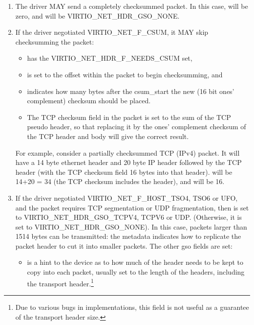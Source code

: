 \begin{enumerate}
\item The driver MAY send a completely checksummed packet.  In this case,
   will be zero, and  will be VIRTIO_NET_HDR_GSO_NONE.

\item If the driver negotiated VIRTIO_NET_F_CSUM, it MAY skip
  checksumming the packet:
  \begin{itemize}
  \item {} has the VIRTIO_NET_HDR_F_NEEDS_CSUM set,

  \item {} is set to the offset within the packet to begin checksumming,
    and

  \item {} indicates how many bytes after the csum_start the
    new (16 bit ones' complement) checksum should be placed.

  \item The TCP checksum field in the packet is set to the sum
    of the TCP pseudo header, so that replacing it by the ones'
    complement checksum of the TCP header and body will give the
    correct result.
  \end{itemize}

\begin{note}
For example, consider a partially checksummed TCP (IPv4) packet.
It will have a 14 byte ethernet header and 20 byte IP header
followed by the TCP header (with the TCP checksum field 16 bytes
into that header).  will be 14+20 = 34 (the TCP
checksum includes the header), and  will be 16.
\end{note}

\item If the driver negotiated
  VIRTIO_NET_F_HOST_TSO4, TSO6 or UFO, and the packet requires
  TCP segmentation or UDP fragmentation, then 
  is set to VIRTIO_NET_HDR_GSO_TCPV4, TCPV6 or UDP.
  (Otherwise, it is set to VIRTIO_NET_HDR_GSO_NONE). In this
  case, packets larger than 1514 bytes can be transmitted: the
  metadata indicates how to replicate the packet header to cut it
  into smaller packets. The other gso fields are set:

  \begin{itemize}
  \item {} is a hint to the device as to how much of the header
    needs to be kept to copy into each packet, usually set to the
    length of the headers, including the transport header.\footnote{Due to various bugs in implementations, this field is not useful
as a guarantee of the transport header size.
}


\end{itemize}
\end{enumerate}
